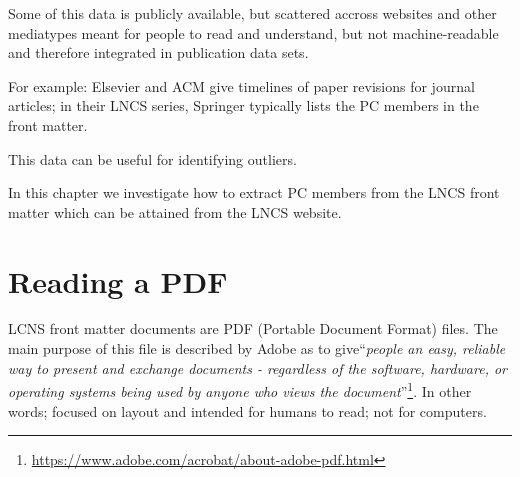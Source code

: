 \documentclass{ou-report}
\begin{document}
Some of this data is publicly available, but scattered accross websites and 
other mediatypes meant for people to read and understand, but not
machine-readable and therefore integrated in publication data sets.

For example: Elsevier and ACM give timelines of paper revisions for journal
articles; in their LNCS series, Springer typically lists the PC members in the 
front matter.

This data can be useful for identifying outliers.

In this chapter we investigate how to extract PC members from the LNCS front
matter which can be attained from the LNCS website.

        
\section{Reading a PDF}
LCNS front matter documents are PDF (Portable Document Format) files. The main
purpose
of this file is described by Adobe as to give``\textit{people an easy, reliable
way to present and exchange documents - regardless of the software, hardware, or
operating systems being used by anyone who views the
document}''\footnote{\url{https://www.adobe.com/acrobat/about-adobe-pdf.html}}. 
In other words; focused on layout and intended for humans to read; not for
computers. 
\end{document}
